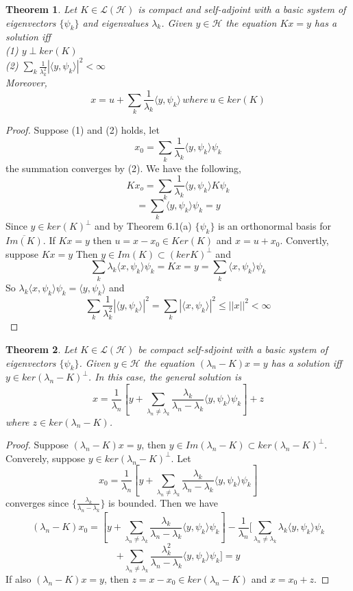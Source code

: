 \documentclass{article}
\newtheorem{Thm}{Theorem}[section]
\newcommand{\HH}{\mathcal{H}}
\newcommand{\LL}{\mathcal{L}}
\begin{document}
\begin{Thm}
	Let $K\in \LL(\HH)$ is compact and self-adjoint with a basic system of eigenvectors $\{\psi_k\}$ and eigenvalues $\lambda_k$. Given $y\in \HH$ the equation $Kx=y$ has a solution iff \\
	(1) $y\perp ker(K)$ \\
	(2) $\sum_{k}\frac{1}{\lambda_k^2}|\langle y, \psi_k \rangle|^2<\infty$\\
	Moreover,
	\[
	x=u+\sum_k \frac{1}{\lambda_k}\langle y, \psi_k \rangle \, where \, u\in ker(K)
	\]
\end{Thm}
\begin{proof}
	Suppose (1) and (2) holds, let 
	\[x_0 = \sum_k \frac {1}{\lambda_k}\langle y, \psi_k \rangle \psi_k \]
	the summation converges by (2). We have the following,
	\[Kx_o=\sum_k \frac {1}{\lambda_k}\langle y, \psi_k \rangle K\psi_k\]
	\[=\sum_k \langle y, \psi_k \rangle \psi_k=y\]
	Since $y\in ker(K)^{\perp}$ and by Theorem 6.1(a) $\{\psi_k\}$ is an orthonormal basis for $\overline{Im(K)}$. If $Kx=y$ then $u=x-x_0\in Ker(K)$ and $x=u+x_0$. Convertly, suppose $Kx=y$ Then $y\in Im(K)\subset (ker K)^\perp$ and 
	\[\sum_k{\lambda_k\langle x, \psi_k \rangle \psi_k}=Kx=y=\sum_k{\langle x, \psi_k \rangle \psi_k} \]
	So $\lambda_k \langle x, \psi_k \rangle \psi_k=\langle y, \psi_k \rangle $ and
	\[\sum_k \frac{1}{\lambda_k^2}|\langle y, \psi_k \rangle|^2 = \sum_k |\langle x, \psi_k \rangle|^2\leq ||x||^2<\infty \]
\end{proof}
\begin{Thm}
	Let $K\in \LL(\HH)$ be compact self-sdjoint with a basic system of eigenvectors $\{\psi_k \}$. Given $y\in \HH $ the equation $(\lambda_n -K)x=y$ has a solution iff $ y\in ker(\lambda_n - K)^\perp$. In this case, the general solution is 
	\[x=\frac{1}{\lambda_n}[y+\sum_{\lambda_n\neq \lambda_k} \frac{\lambda_k}{\lambda_n-\lambda_k}\langle y, \psi_k \rangle \psi_k ]+z\]
	where $z \in ker(\lambda_n-K)$.
\end{Thm}
\begin{proof}
	Suppose $(\lambda_n-K)x=y$, then $y\in Im(\lambda_n-K)\subset ker(\lambda_n-K)^\perp $. Converely, suppose $y\in ker(\lambda_n-K)^\perp$. Let 
	\[x_0 =\frac{1}{\lambda_n}[y+\sum_{\lambda_n\neq \lambda_k} \frac{\lambda_k}{\lambda_n-\lambda_k}\langle y, \psi_k \rangle \psi_k ]\]
	converges since $\{\frac{\lambda_k}{\lambda_n-\lambda_k}\}$ is bounded. Then we have 
	\[ (\lambda_n-K)x_0 =[y+\sum_{\lambda_n\neq \lambda_k} \frac{\lambda_k}{\lambda_n-\lambda_k}\langle y, \psi_k \rangle \psi_k ]-\frac{1}{\lambda_n}[\sum_{\lambda_n\neq \lambda_k} \lambda_k \langle y, \psi_k \rangle \psi_k \]\[+\sum_{\lambda_n\neq \lambda_k} \frac{\lambda_k^2}{\lambda_n-\lambda_k}\langle y, \psi_k \rangle \psi_k ] = y\] 
	If also $(\lambda_n-K)x=y$, then $z=x-x_0\in ker(\lambda_n-K)$ and $x=x_0+z$.
\end{proof}
\end{document}
